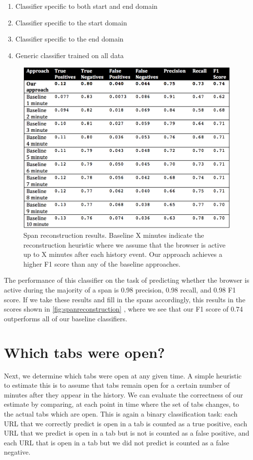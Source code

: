 \documentclass{sigchi}
\begin{document}
\begin{enumerate}
	\item Classifier specific to both start and end domain
	\item Classifier specific to the start domain
	\item Classifier specific to the end domain
	\item Generic classifier trained on all data
\end{enumerate}

\begin{figure}[!h]
\centering
\includegraphics[width=0.9\columnwidth]{span_reconstruction_results}
\caption{Span reconstruction results. Baseline X minutes indicate the reconstruction heuristic where we assume that the browser is active up to X minutes after each history event. Our approach achieves a higher F1 score than any of the baseline approaches.}
\label{fig:spanreconstruction}
\end{figure}

The performance of this classifier on the task of predicting whether the browser is active during the majority of a span is 0.98 precision, 0.98 recall, and 0.98 F1 score. If we take these results and fill in the spans accordingly, this results in the scores shown in \autoref{fig:spanreconstruction} , where we see that our F1 score of 0.74 outperforms all of our baseline classifiers.

\section{Which tabs were open?}

Next, we determine which tabs were open at any given time. A simple heuristic to estimate this is to assume that tabs remain open for a certain number of minutes after they appear in the history. We can evaluate the correctness of our estimate by comparing, at each point in time where the set of tabs changes, to the actual tabs which are open. This is again a binary classification task: each URL that we correctly predict is open in a tab is counted as a true positive, each URL that we predict is open in a tab but is not is counted as a false positive, and each URL that is open in a tab but we did not predict is counted as a false negative.
\end{document}
